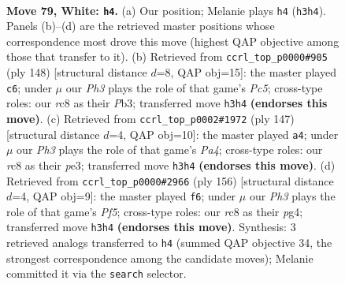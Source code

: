 \documentclass[11pt]{article}
\begin{document}
\clearpage

\begin{figure}[p]\centering
\begin{subfigure}{0.46\textwidth}\centering
\resizebox{\linewidth}{!}{%
\newchessgame
\chessboard[
  setfen={2r4k/1R6/8/8/5K2/3r3P/8/8 w - - 1 79},
  showmover=false,
  pgfstyle=straightmove, color=movearrow, markmove={h3-h4}
]}
\caption{}
\end{subfigure}\hfill
\begin{subfigure}{0.46\textwidth}\centering
\resizebox{\linewidth}{!}{%
\newchessgame
\chessboard[
  setfen={8/K5R1/5R2/2P4r/8/1P6/7k/8 w - - 1 75},
  showmover=false,
  pgfstyle=straightmove, color=movearrow, markmove={c5-c6}
]}
\caption{}
\end{subfigure}
\\[4pt]
\begin{subfigure}{0.46\textwidth}\centering
\resizebox{\linewidth}{!}{%
\newchessgame
\chessboard[
  setfen={8/3k4/8/p1R1K3/7r/4P3/8/8 b - - 8 74},
  showmover=false,
  pgfstyle=straightmove, color=movearrow, markmove={a5-a4}
]}
\caption{}
\end{subfigure}\hfill
\begin{subfigure}{0.46\textwidth}\centering
\resizebox{\linewidth}{!}{%
\newchessgame
\chessboard[
  setfen={6K1/3k4/8/3r1P2/6p1/4R3/8/8 w - - 9 79},
  showmover=false,
  pgfstyle=straightmove, color=movearrow, markmove={f5-f6}
]}
\caption{}
\end{subfigure}
\caption{\textbf{Move 79, White: \texttt{h4}.} (a) Our position; Melanie plays \texttt{h4} (\texttt{h3h4}). Panels (b)--(d) are the retrieved master positions whose correspondence most drove this move (highest QAP objective among those that transfer to it). (b) Retrieved from \texttt{ccrl\_top\_p0000\#905} (ply 148) [structural distance $d$=8, QAP obj=15]: the master played \texttt{c6}; under $\mu$ our \emph{Ph3} plays the role of that game's \emph{Pc5}; cross-type roles: our \emph{r}c8 as their \emph{P}b3; transferred move \texttt{h3h4} \textbf{(endorses this move)}. (c) Retrieved from \texttt{ccrl\_top\_p0002\#1972} (ply 147) [structural distance $d$=4, QAP obj=10]: the master played \texttt{a4}; under $\mu$ our \emph{Ph3} plays the role of that game's \emph{Pa4}; cross-type roles: our \emph{r}c8 as their \emph{p}e3; transferred move \texttt{h3h4} \textbf{(endorses this move)}. (d) Retrieved from \texttt{ccrl\_top\_p0000\#2966} (ply 156) [structural distance $d$=4, QAP obj=9]: the master played \texttt{f6}; under $\mu$ our \emph{Ph3} plays the role of that game's \emph{Pf5}; cross-type roles: our \emph{r}c8 as their \emph{p}g4; transferred move \texttt{h3h4} \textbf{(endorses this move)}. Synthesis: 3 retrieved analogs transferred to \texttt{h4} (summed QAP objective 34, the strongest correspondence among the candidate moves); Melanie committed it via the \texttt{search} selector.}
\label{fig:thought-m156}
\end{figure}
\end{document}
